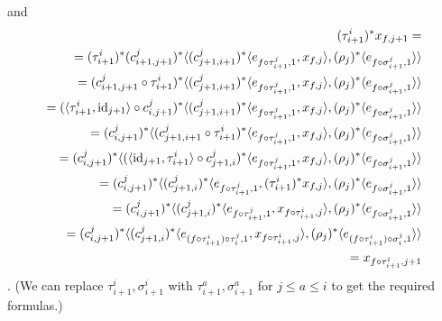 and \begin{align*}(\tau^i_{i+1})^* x_{f, j+1} =\\ =(\tau^i_{i+1})^* (c^j_{i+1, j+1})^* \langle(c^j_{j+1, i+1})^* \langle e_{f \circ \tau^j_{i+1}, 1}, x_{f, j} \rangle, (\rho_{j})^* \langle e_{f \circ \sigma^j_{i+1}, 1} \rangle \rangle\\ = (c^j_{i+1, j+1} \circ \tau^i_{i+1})^* \langle(c^j_{j+1, i+1})^* \langle e_{f \circ \tau^j_{i+1}, 1}, x_{f, j} \rangle, (\rho_{j})^* \langle e_{f \circ \sigma^j_{i+1}, 1} \rangle \rangle\\ = (\langle \tau^i_{i+1}, \mathrm{id}_{j+1} \rangle \circ c^j_{i, j+1})^* \langle(c^j_{j+1, i+1})^* \langle e_{f \circ \tau^j_{i+1}, 1}, x_{f, j} \rangle, (\rho_{j})^* \langle e_{f \circ \sigma^j_{i+1}, 1} \rangle \rangle \\ = (c^j_{i, j+1})^* \langle (c^j_{j+1, i+1} \circ \tau^i_{i+1})^* \langle e_{f \circ \tau^j_{i+1}, 1}, x_{f, j} \rangle, (\rho_{j})^* \langle e_{f \circ \sigma^j_{i+1}, 1} \rangle \rangle\\ = (c_{i, j+1}^j)^* \langle (\langle \mathrm{id}_{j+1}, \tau^i_{i+1} \rangle \circ c^j_{j+1, i})^*  \langle e_{f \circ \tau^j_{i+1}, 1}, x_{f, j} \rangle, (\rho_{j})^* \langle e_{f \circ \sigma^j_{i+1}, 1} \rangle \rangle\\ = (c_{i, j+1}^j)^* \langle (c^j_{j+1, i})^* \langle e_{f \circ \tau^j_{i+1}, 1}, (\tau^i_{i+1})^* x_{f, j} \rangle, (\rho_{j})^* \langle e_{f \circ \sigma^j_{i+1}, 1} \rangle \rangle \\ = (c_{i, j+1}^j)^* \langle (c^j_{j+1, i})^* \langle e_{f \circ \tau^j_{i+1}, 1}, x_{f \circ \tau^i_{i+1}, j} \rangle, (\rho_{j})^* \langle e_{f \circ \sigma^j_{i+1}, 1} \rangle \rangle \\ = (c_{i, j+1}^j)^* \langle (c^j_{j+1, i})^* \langle e_{(f \circ \tau^i_{i+1}) \circ \tau^j_i, 1}, x_{f \circ \tau^i_{i+1}, j} \rangle, (\rho_{j})^* \langle e_{(f \circ \tau^i_{i+1}) \circ \sigma^j_{i}, 1} \rangle \rangle \\ = x_{f \circ \tau^i_{i+1}, j+1}
 \end{align*}. (We can replace $\tau^i_{i+1}, \sigma^i_{i+1}$ with $\tau^a_{i+1}, \sigma^a_{i+1}$ for $j \leq a \leq i$ to get the required formulas.) 
 
